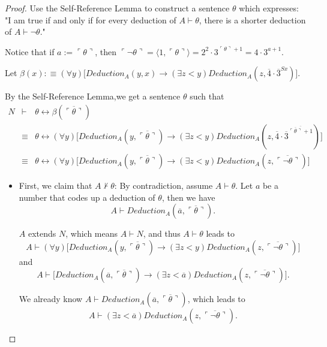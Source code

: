 \documentclass[11pt,letterpaper]{book}
\theoremstyle{definition}
\begin{document}
\begin{proof}
Use the Self-Reference Lemma to construct a sentence $\theta$ which expresses: "I am true if and only if for every deduction of $A \vdash \theta$, there is a shorter deduction of $A \vdash \lnot \theta$."

Notice that if $a := \ulcorner \theta \urcorner$, then $\ulcorner \lnot \theta \urcorner = \langle 1, \ulcorner \theta \urcorner \rangle = 2^2 \cdot 3^{\ulcorner \theta \urcorner + 1} = 4 \cdot 3^{a+1} .$

Let $\beta (x) : \equiv (\forall y ) \big[ Deduction_A (y, x) \rightarrow (\exists z < y) Deduction_A (z, \overline{4} \cdot \overline{3}^{Sx} ) \big]. $

By the Self-Reference Lemma,we get a sentence $\theta$ such that
\begin{eqnarray*}
N & \vdash & \theta \leftrightarrow \beta (\overline{\ulcorner \theta \urcorner}) \\
&  \equiv & \theta \leftrightarrow (\forall y ) \big[ Deduction_A (y, \overline{\ulcorner \theta \urcorner}) \rightarrow (\exists z < y) Deduction_A (z, \overline{4} \cdot \overline{3}^{\overline{\overline{\ulcorner \theta \urcorner} + 1}} ) \big] \\
&  \equiv & \theta \leftrightarrow (\forall y ) \big[ Deduction_A (y, \overline{\ulcorner \theta \urcorner}) \rightarrow (\exists z < y) Deduction_A (z, \overline{ \ulcorner \lnot \theta \urcorner } ) \big]
\end{eqnarray*}

\begin{itemize}
\item{First, we claim that $A \not \vdash \theta$: By contradiction, assume $A \vdash \theta$. Let $a$ be a number that codes up a deduction of $\theta$, then we have
$$ A \vdash Deduction_A (\overline{a}, \overline{\ulcorner \theta \urcorner} ) .$$

$A$ extends $N$, which means $A \vdash N$, and thus $A \vdash \theta $ leads to
$$ A \vdash (\forall y ) \big[ Deduction_A (y, \overline{\ulcorner \theta \urcorner}) \rightarrow (\exists z < y) Deduction_A (z, \overline{ \ulcorner \lnot \theta \urcorner } ) \big] $$
and
$$ A \vdash  \big[ Deduction_A (\overline{a}, \overline{\ulcorner \theta \urcorner}) \rightarrow (\exists z < \overline{a}) Deduction_A (z, \overline{ \ulcorner \lnot \theta \urcorner } ) \big] .$$

We already know $A \vdash Deduction_A (\overline{a}, \overline{\ulcorner \theta \urcorner} )$, which leads to
\begin{equation}
A \vdash (\exists z < \overline{a}) Deduction_A (z, \overline{ \ulcorner \lnot \theta \urcorner } ). \label{eq:theorem_rosser_1} \tag{*}
\end{equation}

}
\end{itemize}
\end{proof}
\end{document}
